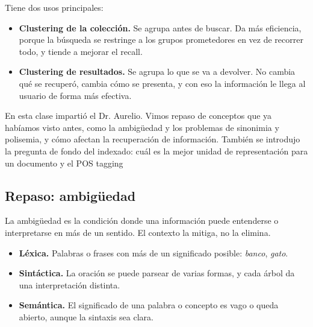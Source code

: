 \documentclass[11pt,letterpaper]{article}
\begin{document}
Tiene dos usos principales:

\begin{itemize}[itemsep=0.2em]
    \item \textbf{Clustering de la colección.} Se agrupa antes de
          buscar. Da más eficiencia, porque la búsqueda se restringe a
          los grupos prometedores en vez de recorrer todo, y tiende a
          mejorar el recall.
    \item \textbf{Clustering de resultados.} Se agrupa lo que se va a
          devolver. No cambia qué se recuperó, cambia cómo se presenta,
          y con eso la información le llega al usuario de forma más
          efectiva.
\end{itemize}

\newpage




\begin{quick_sum}
    En esta clase impartió el Dr. Aurelio. Vimos repaso de conceptos que ya habíamos 
    visto antes, como la ambigüedad y los problemas de sinonimia y polisemia, y cómo 
    afectan la recuperación de información. 
    También se introdujo la pregunta de fondo del indexado: cuál es la mejor unidad 
    de representación para un documento y el POS tagging
\end{quick_sum}

\subsection*{Repaso: ambigüedad}

La ambigüedad es la condición donde una información puede entenderse o
interpretarse en más de un sentido. El contexto la mitiga, no la
elimina.

\begin{itemize}[itemsep=0.2em]
    \item \textbf{Léxica.} Palabras o frases con más de un significado
          posible: \textit{banco}, \textit{gato}.
    \item \textbf{Sintáctica.} La oración se puede parsear de varias
          formas, y cada árbol da una interpretación distinta.
    \item \textbf{Semántica.} El significado de una palabra o concepto
          es vago o queda abierto, aunque la sintaxis sea clara.
\end{itemize}
\end{document}
